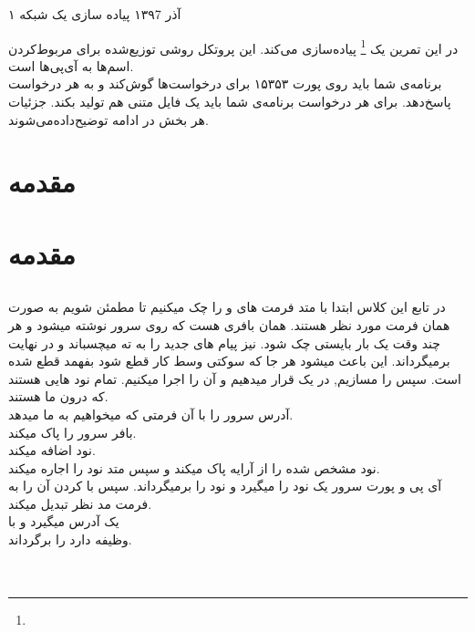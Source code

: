 \documentclass{article}
\begin{document}
    \handout
    {}
    {۱}
    {آذر ۱۳۹7}
    {پیاده سازی یک شبکه     }
    {}
    
    \vspace{0.3cm}
    
    در این تمرین یک 
    \footnote{}
    پیاده‌سازی ‌می‌کند.
    این پروتکل روشی توزیع‌شده برای مربوط‌کردن اسم‌ها به آی‌پی‌ها است.
    \\
    برنامه‌ی شما باید روی پورت ۱۵۳۵۳ برای درخواست‌ها گوش‌کند و به هر درخواست پاسخ‌دهد. برای هر درخواست برنامه‌ی شما باید یک فایل متنی هم تولید بکند. جزئیات هر بخش در ادامه توضیح‌داده‌می‌شوند.
    \\
    \section{مقدمه}
    \section{مقدمه}
	\subsection{}
	در تابع      این کلاس ابتدا با متد  فرمت های  و  را چک میکنیم تا مطمئن شویم به صورت همان فرمت مورد نظر هستند.  همان بافری هست که روی سرور نوشته میشود و هر چند وقت یک بار بایستی چک شود.  نیز پیام های جدید را به ته  میچسباند  و در نهایت  برمیگرداند. این  باعث میشود هر جا که سوکتی وسط کار قطع شود بفهمد قطع شده است. سپس  را مسازیم, در یک  قرار میدهیم و آن را اجرا میکنیم.  تمام نود هایی هستند که درون ما هستند.\\
 آدرس سرور را با آن فرمتی که میخواهیم به ما میدهد.
\\ 
 بافر سرور را پاک میکند.
\\
 نود اضافه میکند.
\\
 نود مشخص شده را از آرایه پاک میکند و سپس  متد  نود را اجاره میکند.
\\
 آی پی و پورت سرور  یک نود را میگیرد و نود را برمیگرداند. سپس با  کردن آن را به فرمت مد نظر تبدیل میکند.
\\
 یک آدرس میگیرد و با
\\
 وظیفه دارد  را برگرداند.
\\
\\
\\
\end{document}
